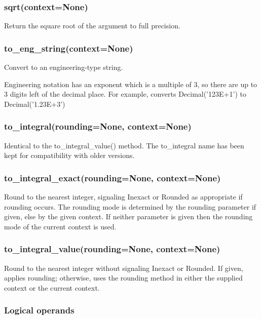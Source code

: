 \subsubsection{sqrt(context=None)}

Return the square root of the argument to full precision.


\subsubsection{to\_eng\_string(context=None)}

Convert to an engineering-type string.

Engineering notation has an exponent which is a multiple of 3, so there are up to 3 digits left of the decimal place. For example, converts Decimal('123E+1') to Decimal('1.23E+3')

\subsubsection{to\_integral(rounding=None, context=None)}

Identical to the to\_integral\_value() method. The to\_integral name has been kept for compatibility with older versions.

\subsubsection{to\_integral\_exact(rounding=None, context=None)}

Round to the nearest integer, signaling Inexact or Rounded as appropriate if rounding occurs. The rounding mode is determined by the rounding parameter if given, else by the given context. If neither parameter is given then the rounding mode of the current context is used.

\subsubsection{to\_integral\_value(rounding=None, context=None)}

Round to the nearest integer without signaling Inexact or Rounded. If given, applies rounding; otherwise, uses the rounding method in either the supplied context or the current context.

\subsubsection{Logical operands}

